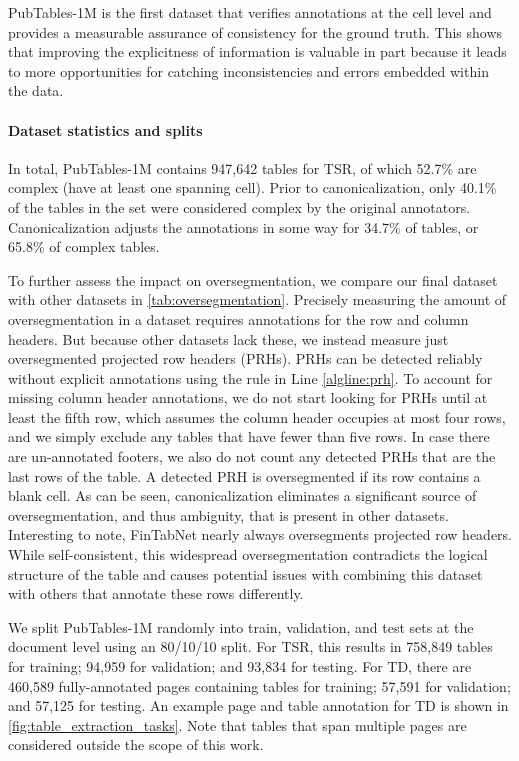 \documentclass[10pt,twocolumn,letterpaper]{article}
\begin{document}
PubTables-1M is the first dataset that verifies annotations at the cell level and provides a measurable assurance of consistency for the ground truth.
This shows that improving the explicitness of information is valuable in part because it leads to more opportunities for catching inconsistencies and errors embedded within the data.

\paragraph{Dataset statistics and splits}\label{par:statistics} In total, PubTables-1M contains 947,642 tables for TSR, of which 52.7\% are complex (have at least one spanning cell).
Prior to canonicalization, only 40.1\% of the tables in the set were considered complex by the original annotators.
Canonicalization adjusts the annotations in some way for 34.7\% of tables, or 65.8\% of complex tables.

To further assess the impact on oversegmentation, we compare our final dataset with other datasets in \cref{tab:oversegmentation}.
Precisely measuring the amount of oversegmentation in a dataset requires annotations for the row and column headers.
But because other datasets lack these, we instead measure just oversegmented projected row headers (PRHs).
PRHs can be detected reliably without explicit annotations using the rule in Line \ref{algline:prh}.
To account for missing column header annotations, we do not start looking for PRHs until at least the fifth row, which assumes the column header occupies at most four rows, and we simply exclude any tables that have fewer than five rows.
In case there are un-annotated footers, we also do not count any detected PRHs that are the last rows of the table.
A detected PRH is oversegmented if its row contains a blank cell.
As can be seen, canonicalization eliminates a significant source of oversegmentation, and thus ambiguity, that is present in other datasets.
Interesting to note, FinTabNet nearly always oversegments projected row headers.
While self-consistent, this widespread oversegmentation contradicts the logical structure of the table and causes potential issues with combining this dataset with others that annotate these rows differently.

We split PubTables-1M randomly into train, validation, and test sets at the document level using an 80/10/10 split.
For TSR, this results in 758,849 tables for training; 94,959 for validation; and 93,834 for testing.
For TD, there are 460,589 fully-annotated pages containing tables for training; 57,591 for validation; and 57,125 for testing.
An example page and table annotation for TD is shown in \cref{fig:table_extraction_tasks}.
Note that tables that span multiple pages are considered outside the scope of this work.
\end{document}

